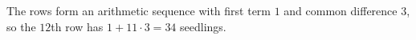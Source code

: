 The rows form an arithmetic sequence with first term $1$ and common difference $3$, so the $12$th row has $1+11\cdot3=\boxed{34}$ seedlings.
